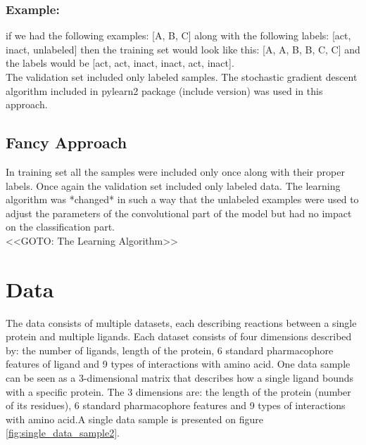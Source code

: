 \documentclass[a4paper,10pt]{report}
\begin{document}
	  \subsubsection{Example:} if we had the following examples: [A, B, C] along with the following labels: [act, inact, unlabeled] then the training set would look like this: [A, A, B, B, C, C] and the labels would be [act, act, inact, inact, act, inact].\\
	  
	  The validation set included only labeled samples. The stochastic gradient descent algorithm included in pylearn2 package (include version) was used in this approach.\\
	  
	\subsection{Fancy Approach}
	In training set all the samples were included only once along with their proper labels. Once again the validation set included only labeled data. The learning algorithm was *changed* in such a way that the unlabeled examples were used to adjust the parameters of the convolutional part of the model but had no impact on the classification part.\\
    
	<<GOTO: The Learning Algorithm>>\\      
      
      \section{Data}
	The data consists of multiple datasets, each describing reactions between a single protein and multiple ligands. Each dataset consists of four dimensions described by: the number of ligands, length of the protein, 6 standard pharmacophore features of ligand and 9 types of interactions with amino acid\cite{2DSIFT}. One data sample can be seen as a 3-dimensional matrix that describes how a single ligand bounds with a specific protein. The 3 dimensions are: the length of the protein (number of its residues), 6 standard pharmacophore features and 9 types of interactions with amino acid.A single data sample is presented on figure \ref{fig:single_data_sample2}.\\
	
\end{document}
